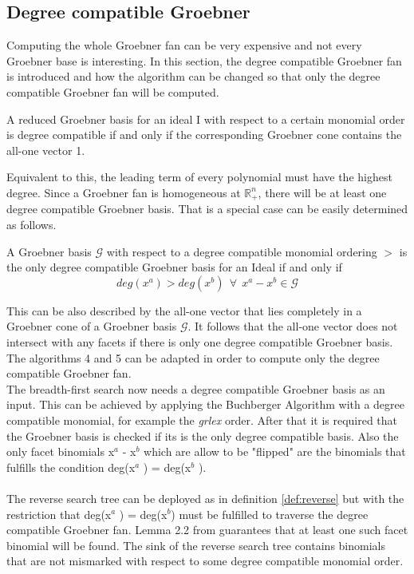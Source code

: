 \subsection{Degree compatible Groebner}
\label{subsec:degreecomp}
Computing the whole Groebner fan can be very expensive and not every Groebner base is interesting.
In this section, the degree compatible Groebner fan is introduced and how the algorithm can
be changed so that only the degree compatible Groebner fan will be computed.\\
\begin{env_definition}
\cite{dueckpaper}
A reduced Groebner basis for an ideal I with respect to a certain monomial order is
degree compatible if and only if the corresponding Groebner cone contains the all-one vector 1.
\end{env_definition}
Equivalent to this, the leading term of every polynomial must have the highest degree.
Since a Groebner fan is homogeneous at $\mathbb{R}^{n}_{+}$, there will be at least one degree compatible Groebner basis.
That is a special case can be easily determined as follows.

\begin{env_definition}
\cite{dueckpaper}
A Groebner basis $\mathcal{G}$ with respect to a degree compatible monomial ordering $>$  is the only degree compatible Groebner basis for an Ideal if and only if
\[ deg(x^{a}) > deg(x^{b})~~ \forall~~ x^{a}-x^{b}\in \mathcal{G} \] 
\end{env_definition}

This can be also described by the all-one vector that lies completely in a Groebner cone of a Groebner basis $\mathcal{G}$.
It follows that the all-one vector does not intersect with any facets if there is only one degree compatible Groebner basis. \\

The algorithms 4 and 5 can be adapted in order to compute only the degree compatible Groebner fan.\\ 
The breadth-first search now needs a degree compatible Groebner basis as an input. This can be achieved by applying the Buchberger Algorithm with a degree compatible monomial, for example the \textit{grlex} order. After that it is required that the Groebner basis is checked if its is the only degree compatible basis. %
Also the only facet binomials x$^{a}$ - x$^{b}$ which are allow to be "flipped" are the binomials that fulfills the condition
deg(x$^{a}$ ) = deg(x$^{b} $ ). \\ \\
The reverse search tree can be deployed as in definition \ref{def:reverse} but with the restriction that deg(x$^{a}$ ) = deg(x$^{b}$) must be fulfilled to traverse the degree compatible Groebner fan.
Lemma 2.2 from \cite{dueckpaper} guarantees that at least one such facet binomial will be found. 
The sink of the reverse search tree contains binomials that are not mismarked with respect to some degree compatible monomial order. 

